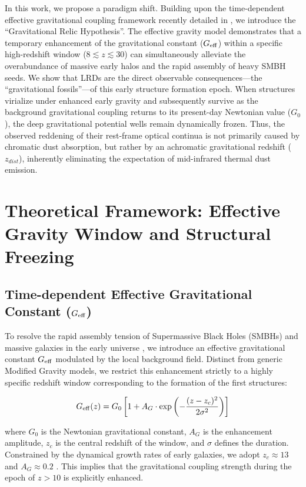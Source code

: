 \documentclass[twocolumn]{aastex631}
\begin{document}
In this work, we propose a paradigm shift. Building upon the time-dependent effective gravitational coupling framework recently detailed in \citet[submitted]{Xin202X}, we introduce the ``Gravitational Relic Hypothesis''. The effective gravity model demonstrates that a temporary enhancement of the gravitational constant ($G_{\rm eff}$) within a specific high-redshift window ($8 \lesssim z \lesssim 30$) can simultaneously alleviate the overabundance of massive early halos and the rapid assembly of heavy SMBH seeds. We show that LRDs are the direct observable consequences---the ``gravitational fossils''---of this early structure formation epoch. When structures virialize under enhanced early gravity and subsequently survive as the background gravitational coupling returns to its present-day Newtonian value ($G_0$), the deep gravitational potential wells remain dynamically frozen. Thus, the observed reddening of their rest-frame optical continua is not primarily caused by chromatic dust absorption, but rather by an achromatic gravitational redshift ($z_{dist}$), inherently eliminating the expectation of mid-infrared thermal dust emission.

\section{Theoretical Framework: Effective Gravity Window and Structural Freezing} \label{sec:theory}

\subsection{Time-dependent Effective Gravitational Constant ($G_{\rm eff}$)}
To resolve the rapid assembly tension of Supermassive Black Holes (SMBHs) and massive galaxies in the early universe \citep[e.g., GS-z13-1-LA at $z=13.1$; for standard formation channels see][]{Loeb2011, Barrufet2023, Inayoshi2024}, we introduce an effective gravitational constant $G_{\rm eff}$ modulated by the local background field. Distinct from generic Modified Gravity models, we restrict this enhancement strictly to a highly specific redshift window corresponding to the formation of the first structures:

\begin{equation}
    G_{\rm eff}(z) = G_0 \left[ 1 + A_G \cdot \exp\left( -\frac{(z - z_c)^2}{2\sigma^2} \right) \right]
\end{equation}

where $G_0$ is the Newtonian gravitational constant, $A_G$ is the enhancement amplitude, $z_c$ is the central redshift of the window, and $\sigma$ defines the duration. Constrained by the dynamical growth rates of early galaxies, we adopt $z_c \approx 13$ and $A_G \approx 0.2$ \citep[submitted]{Xin202X}. This implies that the gravitational coupling strength during the epoch of $z > 10$ is explicitly enhanced.
\end{document}
